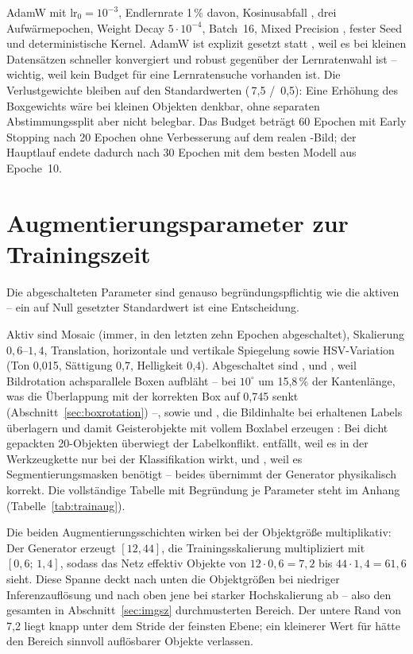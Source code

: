  AdamW \parencite{loshchilov2019} mit
$\text{lr}_0 = 10^{-3}$, Endlernrate 1\,\% davon, Kosinusabfall
\parencite{loshchilov2017sgdr}, drei Aufwärmepochen, Weight Decay $5\cdot10^{-4}$,
Batch~16, Mixed Precision \parencite{micikevicius2018}, fester Seed und
deterministische Kernel. AdamW ist explizit gesetzt statt , weil es
bei kleinen Datensätzen schneller konvergiert und robust gegenüber der
Lernratenwahl ist -- wichtig, weil kein Budget für eine Lernratensuche vorhanden
ist. Die Verlustgewichte bleiben auf den Standardwerten
(\,7,5 / \,0,5): Eine Erhöhung des Boxgewichts wäre bei
kleinen Objekten denkbar, ohne separaten Abstimmungssplit aber nicht belegbar.
Das Budget beträgt 60 Epochen mit Early Stopping nach 20 Epochen ohne
Verbesserung auf dem realen -Bild; der Hauptlauf endete dadurch nach
30 Epochen mit dem besten Modell aus Epoche~10.

\section{Augmentierungsparameter zur Trainingszeit}
\label{sec:trainparam}

Die abgeschalteten Parameter sind genauso begründungspflichtig wie die aktiven --
ein auf Null gesetzter Standardwert ist eine Entscheidung.

Aktiv sind Mosaic (immer, in den letzten zehn Epochen abgeschaltet), Skalierung
$0{,}6$--$1{,}4$, Translation, horizontale und vertikale Spiegelung sowie
HSV-Variation (Ton 0,015, Sättigung 0,7, Helligkeit 0,4). Abgeschaltet sind
,  und , weil Bildrotation
achsparallele Boxen aufbläht -- bei $10^\circ$ um 15,8\,\% der Kantenlänge, was
die Überlappung mit der korrekten Box auf 0,745 senkt
(Abschnitt~\ref{sec:boxrotation}) --, sowie  und , die
Bildinhalte bei erhaltenen Labels überlagern und damit Geisterobjekte mit vollem
Boxlabel erzeugen \parencite{zhang2018mixup,yun2019cutmix}: Bei dicht gepackten
20\px-Objekten überwiegt der Labelkonflikt.  entfällt, weil es in
der Werkzeugkette nur bei der Klassifikation wirkt, und ,
weil es Segmentierungsmasken benötigt -- beides übernimmt der Generator
physikalisch korrekt. Die vollständige Tabelle mit Begründung je Parameter steht
im Anhang (Tabelle~\ref{tab:trainaug}).

Die beiden Augmentierungsschichten wirken bei der Objektgröße multiplikativ: Der
Generator erzeugt $[12, 44]$\px, die Trainingsskalierung multipliziert mit
$[0{,}6;\,1{,}4]$, sodass das Netz effektiv Objekte von
$12 \cdot 0{,}6 = 7{,}2$ bis $44 \cdot 1{,}4 = 61{,}6$\px{} sieht. Diese Spanne
deckt nach unten die Objektgrößen bei niedriger
Inferenzauflösung und nach oben jene bei starker Hochskalierung ab -- also den
gesamten in Abschnitt~\ref{sec:imgsz} durchmusterten Bereich. Der untere Rand von
7,2\px{} liegt knapp unter dem Stride der feinsten Ebene; ein kleinerer Wert für
 hätte den Bereich sinnvoll auflösbarer Objekte verlassen.

